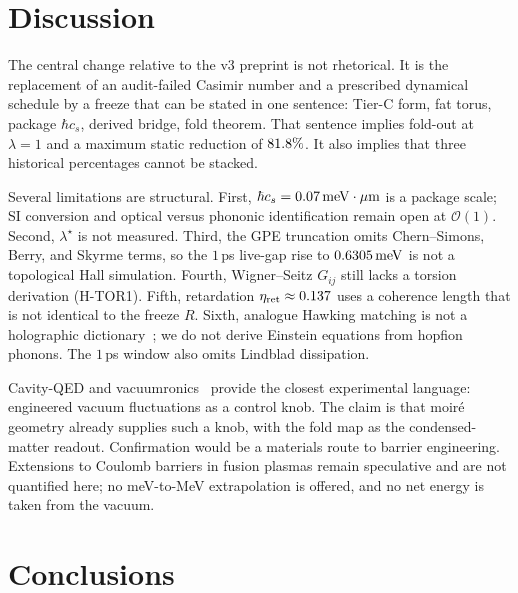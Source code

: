 \documentclass[11pt,letterpaper]{article}
\begin{document}
\section{Discussion}
\label{sec:discussion}

The central change relative to the v3 preprint is not rhetorical. It is the replacement of an audit-failed Casimir number and a prescribed dynamical schedule by a freeze that can be stated in one sentence: Tier-C form, fat torus, package $\hbar c_s$, derived bridge, fold theorem. That sentence implies fold-out at $\lambda=1$ and a maximum static reduction of $81.8\%$. It also implies that three historical percentages cannot be stacked.

Several limitations are structural. First, $\hbar c_s=0.07\,\mathrm{meV\cdot\mu m}$ is a package scale; SI conversion and optical versus phononic identification remain open at $\mathcal{O}(1)$. Second, $\lambda^\star$ is not measured. Third, the GPE truncation omits Chern--Simons, Berry, and Skyrme terms, so the $1$\,ps live-gap rise to $0.6305\,\mathrm{meV}$ is not a topological Hall simulation. Fourth, Wigner--Seitz $G_{ij}$ still lacks a torsion derivation (H-TOR1). Fifth, retardation $\eta_{\mathrm{ret}}\approx0.137$ uses a coherence length that is not identical to the freeze $R$. Sixth, analogue Hawking matching is not a holographic dictionary~\cite{Hartnoll2018,Maldacena1999}; we do not derive Einstein equations from hopfion phonons. The $1$\,ps window also omits Lindblad dissipation.

Cavity-QED and vacuumronics~\cite{Enkner2025,Jiang2025,Bretscher2026} provide the closest experimental language: engineered vacuum fluctuations as a control knob. The \TEVC{} claim is that moir\'e geometry already supplies such a knob, with the fold map as the condensed-matter readout. Confirmation would be a materials route to barrier engineering. Extensions to Coulomb barriers in fusion plasmas remain speculative and are not quantified here; no meV-to-MeV extrapolation is offered, and no net energy is taken from the vacuum.

\section{Conclusions}
\label{sec:conclusions}
\end{document}
